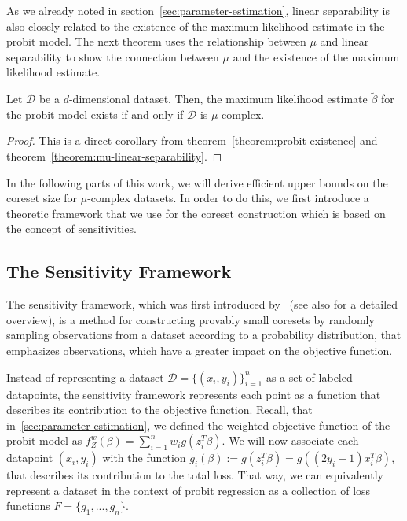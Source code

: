 As we already noted in section~\ref{sec:parameter-estimation},
linear separability is also closely related to the existence
of the maximum likelihood estimate in the probit model.
The next theorem uses the relationship between $\mu$ and
linear separability to show the connection between $\mu$
and the existence of the maximum likelihood estimate.

\begin{theorem}
    Let $\mathcal{D}$ be a $d$-dimensional dataset.
    Then, the maximum likelihood estimate $\tilde\beta$ for the probit
    model exists if and only if $\mathcal{D}$ is $\mu$-complex.
\end{theorem}
\begin{proof}
    This is a direct corollary from theorem~\ref{theorem:probit-existence}
    and theorem~\ref{theorem:mu-linear-separability}.
\end{proof}

In the following parts of this work, we will derive efficient upper
bounds on the coreset size for $\mu$-complex datasets.
In order to do this, we first introduce a theoretic
framework that we use for the coreset construction which
is based on the concept of sensitivities.

\subsection{The Sensitivity Framework}

The sensitivity framework, which was first introduced
by~\cite{feldman-langberg-coresets} (see also
\cite{big-data-tiny-data} for a detailed overview),
is a method for constructing
provably small coresets by randomly sampling observations
from a dataset according to a probability distribution, that
emphasizes observations, which have a greater impact on the
objective function.

Instead of representing a dataset $\mathcal{D} = \{(x_i, y_i)\}_{i=1}^n$
as a set of labeled datapoints, the sensitivity framework
represents each point as a function that describes its
contribution to the objective function.
Recall, that in~\ref{sec:parameter-estimation}, we defined the
weighted objective function of the probit model as
$f_Z^w(\beta) = \sum_{i=1}^n w_i g(z_i^T \beta)$.
We will now associate each datapoint $(x_i, y_i)$ with the function
$g_i(\beta) := g(z_i^T \beta) = g((2y_i - 1)x_i^T \beta)$,
that describes its contribution to the total loss.
That way, we can equivalently represent a dataset in the context
of probit regression as a collection of loss functions
$F = \{g_1, ..., g_n\}$.

